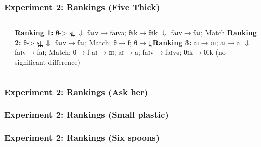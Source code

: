 \documentclass{beamer}
\begin{document}
\begin{frame}[shrink=30]
\frametitle{Experiment 2:  Rankings (Five Thick)}
\begin{columns}
   \begin{center}

\end{center}
\begin{center}
\textbf{Ranking 1:} \linebreak  \linebreak 
θ-> s̪t̪  \linebreak
$\Downarrow$\linebreak 
 faɪv$\rightarrow$faɪvə; θɪk$\rightarrow$θik \linebreak
$\Downarrow$\linebreak 
faɪv$\rightarrow$faɪ;  Match
 \linebreak\linebreak 
\textbf{Ranking 2:}\linebreak\linebreak
 θ-> s̪t̪ \linebreak
$\Downarrow$\linebreak 
faɪv$\rightarrow$faɪ; Match; θ$\rightarrow$f;  θ$\rightarrow$t̪\linebreak\linebreak 
\textbf{Ranking 3:} \linebreak\linebreak 
    aɪ$\rightarrow$ɑɪ; aɪ$\rightarrow$a \linebreak
$\Downarrow$\linebreak 
faɪv$\rightarrow$faɪ; Match; θ$\rightarrow$f\linebreak\linebreak 
aɪ$\rightarrow$ɑɪ; aɪ$\rightarrow$a; faɪv$\rightarrow$faɪvə; θɪk$\rightarrow$θik (no significant difference)
\end{center}
\end{columns}
\end{frame}
\begin{frame}[shrink=30]
\frametitle{Experiment 2:  Rankings (Ask her)}
\begin{figure}

\end{figure}
\end{frame}
\begin{frame}[shrink=25]
\frametitle{Experiment 2:  Rankings (Small plastic)}
\begin{figure}

\end{figure}
\end{frame}
\begin{frame}[shrink=25]
\frametitle{Experiment 2:  Rankings (Six spoons)}
\begin{figure}

\end{figure}
\end{frame}
\end{document}
